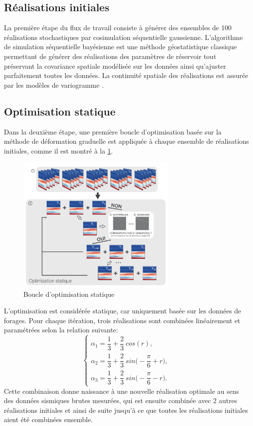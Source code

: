 \subsection{Réalisations initiales}
La première étape du flux de travail consiste à générer des ensembles de 100
réalisations stochastiques par cosimulation séquentielle gaussienne.
L'algorithme de simulation séquentielle bayésienne est une méthode
géostatistique classique permettant de
générer
des réalisations des paramètres de réservoir tout préservant la covariance spatiale modélisée sur les données ainsi qu'ajuster parfaitement toutes les données. La continuité spatiale des réalisations est assurée par les modèles de
variogramme \citep{Doyen2007, Grana2012}.
\subsection{Optimisation statique}
Dans la deuxième étape, une première boucle d'optimisation basée sur la méthode
de déformation graduelle est appliquée à chaque ensemble de réalisations
initiales, comme il est montré à la \cref{fig:1boucle}.
\begin{figure}[!ht]
\centering
\includegraphics[width=0.7\textwidth]{fig/1boucle.pdf}
\caption{Boucle d'optimisation statique}
\label{fig:1boucle}
\end{figure}
L’optimisation est considérée statique, car uniquement basée sur les données de
forages. Pour chaque itération, trois réalisations sont combinées linéairement
et paramétrées selon la relation suivante:
\begin{equation}
\begin{cases}
    \alpha_1 = \dfrac{1}{3} + \dfrac{2}{3}\ cos(r),\\
    \alpha_2 = \dfrac{1}{3} + \dfrac{2}{3}\ sin\bigg(-\dfrac{\pi}{6}+r\bigg),\\
    \alpha_3 = \dfrac{1}{3} + \dfrac{2}{3}\ sin\bigg(-\dfrac{\pi}{6}-r\bigg).
    \end{cases}
\label{eq:eq_DG}
\end{equation}
Cette combinaison donne naissance à une nouvelle réalisation optimale au sens des données sismiques brutes mesurées, qui est ensuite
combinée avec \num{2} autres réalisations initiales et ainsi de suite jusqu'à ce
que toutes les réalisations initiales aient été combinées ensemble.
